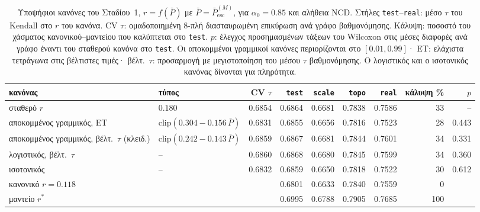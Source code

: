 \begin{table}[t]
\centering
\footnotesize
\caption{Υποψήφιοι κανόνες του Σταδίου~1, $r=f(\bar P)$ με $\bar P=\bar P^{(M)}_{\mathrm{esc}}$, για $\alpha_0=0.85$ και αλήθεια NCD. Στήλες \texttt{test}--\texttt{real}: μέσο $\tau$ του Kendall στο $r$ του κανόνα. CV $\tau$: ομαδοποιημένη 8-πλή διασταυρωμένη επικύρωση ανά γράφο βαθμονόμησης. Κάλυψη: ποσοστό του χάσματος κανονικού--μαντείου που καλύπτεται στο \texttt{test}. $p$: έλεγχος προσημασμένων τάξεων του Wilcoxon στις μέσες διαφορές ανά γράφο έναντι του σταθερού κανόνα στο \texttt{test}. Οι αποκομμένοι γραμμικοί κανόνες περιορίζονται στο $[0.01,0.99]$· ΕΤ: ελάχιστα τετράγωνα στις βέλτιστες τιμές· βέλτ.\ $\tau$: προσαρμογή με μεγιστοποίηση του μέσου $\tau$ βαθμονόμησης. Ο λογιστικός και ο ισοτονικός κανόνας δίνονται για πληρότητα.}
\label{tab:stage1}
\begin{tabular}{@{}>{\raggedright\arraybackslash}p{3.4cm}lrrrrrrr@{}}
\toprule
κανόνας & τύπος & CV $\tau$ & \texttt{test} & \texttt{scale} & \texttt{topo} & \texttt{real} & κάλυψη \% & $p$ \\
\midrule
σταθερό $r$ & $0.180$ & 0.6854 & 0.6864 & 0.6681 & 0.7838 & 0.7586 & 33 & -- \\
αποκομμένος γραμμικός, ΕΤ & $\mathrm{clip}(0.304-0.156\,\bar P)$ & 0.6831 & 0.6855 & 0.6656 & 0.7816 & 0.7523 & 28 & 0.443 \\
αποκομμένος γραμμικός, βέλτ.\ $\tau$ (κλειδ.) & $\mathrm{clip}(0.242-0.143\,\bar P)$ & 0.6859 & 0.6867 & 0.6681 & 0.7844 & 0.7601 & 34 & 0.331 \\
λογιστικός, βέλτ.\ $\tau$ & -- & 0.6860 & 0.6868 & 0.6680 & 0.7845 & 0.7599 & 34 & 0.360 \\
ισοτονικός & -- & 0.6832 & 0.6859 & 0.6650 & 0.7818 & 0.7522 & 30 & 0.612 \\
\midrule
κανονικό $r=0.118$ & & & 0.6801 & 0.6633 & 0.7840 & 0.7559 & 0 & \\
μαντείο $r^*$ & & & 0.6995 & 0.6788 & 0.7905 & 0.7685 & 100 & \\
\bottomrule
\end{tabular}
\end{table}
